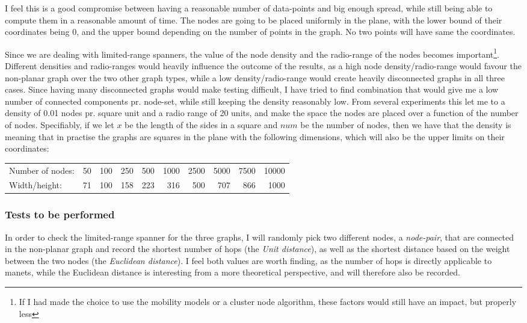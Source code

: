 I feel this is a good compromise between having a reasonable number of data-points and big enough spread, while still being able to compute them in a reasonable amount of time. The nodes are going to be placed uniformly in the plane, with the lower bound of their coordinates being 0, and the upper bound depending on the number of points in the graph. No two points will have same the coordinates. 

Since we are dealing with limited-range spanners, the value of the node density and the radio-range of the nodes becomes important\footnote{If I had made the choice to use the mobility models or a cluster node algorithm, these factors would still have an impact, but properly less}. Different densities and radio-ranges would heavily influence the outcome of the results, as a high node density/radio-range would favour the non-planar graph over the two other graph types, while a low density/radio-range would create heavily disconnected graphs in all three cases. Since having many disconnected graphs would make testing difficult, I have tried to find combination that would give me a low number of connected components pr. node-set, while still keeping the density reasonably low. From several experiments this let me to a density of 0.01 nodes pr. square unit and a radio range of 20 units, and make the space the nodes are placed over a function of the number of nodes. Specifiably, if we let $x$ be the length of the sides in a square and $num$ be the number of nodes, then we have that the density is
meaning that in practise the graphs are squares in the plane with the following dimensions, which will also be the upper limits on their coordinates:
\tiny{
\begin{tabular}{lrrrrrrrrr}
Number of nodes: & 50 & 100 & 250 & 500 & 1000 & 2500 & 5000 & 7500 & 10000 \\
Width/height:    & 71 & 100 & 158 & 223 &  316 &  500 &  707 &  866 & 1000 
\end{tabular} 
}
\subsubsection{Tests to be performed}
\label{section:spanner_tests_performed}
In order to check the limited-range spanner for the three graphs, I will randomly pick two different nodes, a \emph{node-pair}, that are connected in the non-planar graph and record the shortest number of hops (the \emph{Unit distance}), as well as the shortest distance based on the weight between the two nodes (the \emph{Euclidean distance}). I feel both values are worth finding, as the number of hops is directly applicable to \acp{manet}, while the Euclidean distance is interesting from a more theoretical perspective, and will therefore also be recorded.

